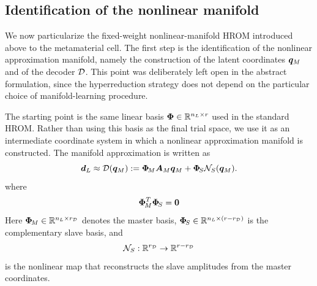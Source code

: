 \documentclass[11pt,a4paper]{article}
\newcommand{\PROMPT}[1]{ }
\begin{document}
\PROMPT{}

%
\PROMPT{}
%

\subsection{Identification of the nonlinear  manifold}
\label{subsec:manifold_identification_cell}

We now particularize the fixed-weight nonlinear-manifold HROM introduced above
to the metamaterial cell. The first step is the identification of the
nonlinear approximation manifold, namely the construction of the latent
coordinates $\bm{q}_M$ and of the decoder $\mathcal{\boldsymbol{D}}$. This point was deliberately
left open in the abstract formulation, since the hyperreduction strategy does
not depend on the particular choice of manifold-learning procedure.

The starting point is the same linear basis $\bm{\Phi}\in\mathbb{R}^{n_L\times r}$ used in the standard
HROM. Rather than using this basis as
the final trial space, we use it as an intermediate coordinate system in which
a nonlinear approximation manifold is constructed. The manifold approximation
is written as
\begin{equation}
\label{eq:decoder_master_slave}
    \bm{d}_L
    \approx
    \mathcal{\boldsymbol{D}}(\bm{q}_M)
    :=
    \bm{\Phi}_{\!M} \bm{A}_{M} \bm{q}_M
    +
    \bm{\Phi}_{\!S} \mathcal{N}_{S}(\bm{q}_M).
\end{equation}
where
\begin{equation}
\label{eq:isorth}
 \bm{\Phi}_{\!M}^T\bm{\Phi}_{\!S}=\bm{0}
\end{equation}
Here $\bm{\Phi}_{\!M}\in\mathbb{R}^{n_L\times r_{\mathcal{D}}}$ denotes the master basis,
$\bm{\Phi}_{\!S}\in\mathbb{R}^{n_L\times(r-r_{\mathcal{D}})}$ is the complementary slave basis,
and
\[
    \mathcal{N}_{S}:\mathbb{R}^{r_{\mathcal{D}}}
    \rightarrow
    \mathbb{R}^{r-r_{\mathcal{D}}}
\]
is the nonlinear map that reconstructs the slave amplitudes from the master
coordinates.
%
%
%
%
%
\end{document}
